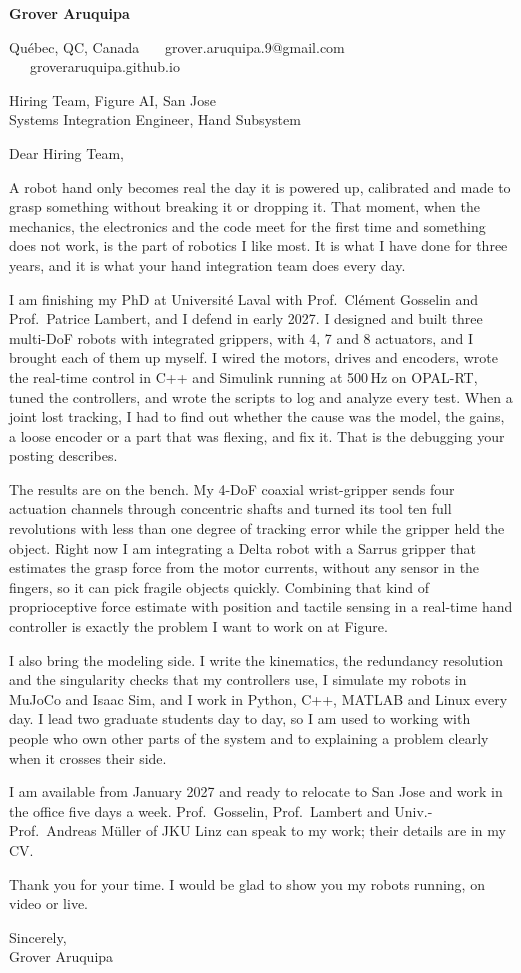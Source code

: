 \documentclass[11pt,letterpaper]{article}
\begin{document}
{\large\bfseries Grover Aruquipa}\par\vspace{-6pt}
{\small Qu\'ebec, QC, Canada \ \textbullet\ \ grover.aruquipa.9@gmail.com \ \textbullet\ \ groveraruquipa.github.io}

\vspace{4pt}
Hiring Team, Figure AI, San Jose\\
Systems Integration Engineer, Hand Subsystem

Dear Hiring Team,

A robot hand only becomes real the day it is powered up, calibrated and made to grasp something without breaking it or dropping it. That moment, when the mechanics, the electronics and the code meet for the first time and something does not work, is the part of robotics I like most. It is what I have done for three years, and it is what your hand integration team does every day.

I am finishing my PhD at Universit\'e Laval with Prof.\ Cl\'ement Gosselin and Prof.\ Patrice Lambert, and I defend in early 2027. I designed and built three multi-DoF robots with integrated grippers, with 4, 7 and 8 actuators, and I brought each of them up myself. I wired the motors, drives and encoders, wrote the real-time control in C++ and Simulink running at 500\,Hz on OPAL-RT, tuned the controllers, and wrote the scripts to log and analyze every test. When a joint lost tracking, I had to find out whether the cause was the model, the gains, a loose encoder or a part that was flexing, and fix it. That is the debugging your posting describes.

The results are on the bench. My 4-DoF coaxial wrist-gripper sends four actuation channels through concentric shafts and turned its tool ten full revolutions with less than one degree of tracking error while the gripper held the object. Right now I am integrating a Delta robot with a Sarrus gripper that estimates the grasp force from the motor currents, without any sensor in the fingers, so it can pick fragile objects quickly. Combining that kind of proprioceptive force estimate with position and tactile sensing in a real-time hand controller is exactly the problem I want to work on at Figure.

I also bring the modeling side. I write the kinematics, the redundancy resolution and the singularity checks that my controllers use, I simulate my robots in MuJoCo and Isaac Sim, and I work in Python, C++, MATLAB and Linux every day. I lead two graduate students day to day, so I am used to working with people who own other parts of the system and to explaining a problem clearly when it crosses their side.

I am available from January 2027 and ready to relocate to San Jose and work in the office five days a week. Prof.\ Gosselin, Prof.\ Lambert and Univ.-Prof.\ Andreas M\"uller of JKU Linz can speak to my work; their details are in my CV.

Thank you for your time. I would be glad to show you my robots running, on video or live.

Sincerely,\\
Grover Aruquipa
\end{document}

